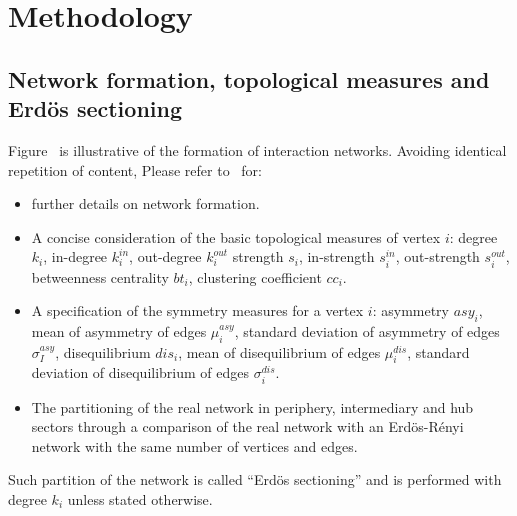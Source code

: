 \documentclass[%
 aip,
 jmp,%
 amsmath,amssymb,
 reprint,%
]{revtex4-1}
\begin{document}
\section{Methodology}\label{sec:methods}


\subsection{Network formation, topological measures and Erd\"os sectioning}\label{subsec:net}
Figure~\cite{} is illustrative of the formation of interaction networks.
Avoiding identical repetition of content,
Please refer to~\cite{evoSN} for:
\begin{itemize}
	\item further details on network formation.
	\item A concise consideration of the basic topological measures of vertex $i$: degree $k_i$, in-degree $k_i^{in}$, out-degree $k_i^{out}$ strength $s_i$, in-strength $s_i^{in}$, out-strength $s_i^{out}$, betweenness centrality $bt_i$, clustering coefficient $cc_i$.
	\item A specification of the symmetry measures for a vertex $i$:
		asymmetry $asy_i$, mean of asymmetry of edges $\mu_i^{asy}$, standard deviation of asymmetry of edges $\sigma_I^{asy}$, disequilibrium $dis_i$, mean of disequilibrium of edges $\mu_i^{dis}$, standard deviation of disequilibrium of edges $\sigma_i^{dis}$.
	\item The partitioning of the real network in periphery, intermediary and hub sectors through a comparison of the real network with an Erd\"os-R\'enyi network with the same number of vertices and edges. 
\end{itemize}
Such partition of the network is called ``Erd\"os sectioning'' and is performed with degree $k_i$ unless stated otherwise.
\end{document}

